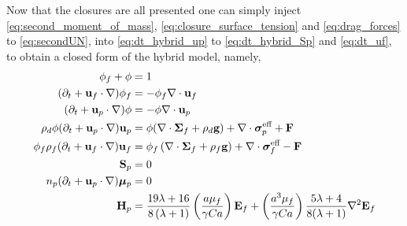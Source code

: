 Now that the closures are all presented one can simply inject \ref{eq:second_moment_of_mass}, \ref{eq:closure_surface_tension} and \ref{eq:drag_forces} to \ref{eq:secondUN}, into  \ref{eq:dt_hybrid_up} to \ref{eq:dt_hybrid_Sp} and \ref{eq:dt_uf}, to obtain a closed form of the hybrid model, namely,  
\begin{align}
    \label{eq:first}
    \phi_f + \phi &= 1\\
    (\pddt + \textbf{u}_f  \cdot \grad) \phi_f
    &= - \phi_f \div \textbf{u}_f\\
    (\pddt + \textbf{u}_p \cdot \grad)\phi
    &=
    - \phi \div \textbf{u}_p\\
    \rho_d \phi (\pddt + \textbf{u}_p \cdot \grad)\textbf{u}_p
    &=
    \phi(\div \bm\Sigma_f
    + \rho_d  \textbf{g})
    + \div \bm\sigma_p^\text{eff}
    + \textbf{F}
    \\
    \phi_f \rho_f(\pddt + \textbf{u}_f  \cdot \grad) \textbf{u}_f
    &= \phi_f 
    \left(\div \bm{\Sigma}_f
    + \rho_f \textbf{g}\right)
    + \div \bm\sigma_f^\text{eff}
    -\textbf{F}\\
    \textbf{S}_p &= 0\\
    n_p (\pddt + \textbf{u}_p \cdot \grad)\bm\mu_p &= 0\\
    \textbf{H}_p
    &=
    \frac{19 \lambda + 16}{8 \left(\lambda + 1\right)}
    \left(\frac{a \mu_f}{\gamma Ca}\right)
    \textbf{E}_f
    +
    \left(\frac{a^3 \mu_f}{\gamma Ca}\right)
    \frac{5\lambda+4}{8(\lambda+1)}\grad^2\textbf{E}_f
    \label{eq:last}
\end{align}
